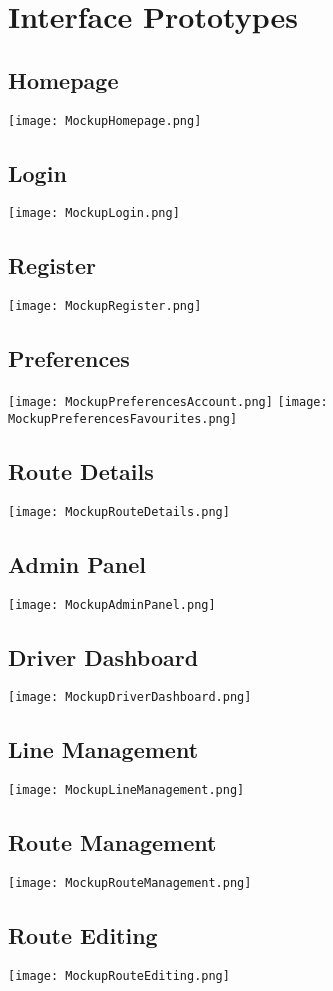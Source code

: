 \section{Interface Prototypes}

\subsection{Homepage}

\texttt{[image: MockupHomepage.png]}

\subsection{Login}

\texttt{[image: MockupLogin.png]}

\subsection{Register}

\texttt{[image: MockupRegister.png]}

\subsection{Preferences}

\texttt{[image: MockupPreferencesAccount.png]}
\texttt{[image: MockupPreferencesFavourites.png]}

\subsection{Route Details}

\texttt{[image: MockupRouteDetails.png]}

\subsection{Admin Panel}

\texttt{[image: MockupAdminPanel.png]}

\subsection{Driver Dashboard}

\texttt{[image: MockupDriverDashboard.png]}

\subsection{Line Management}

\texttt{[image: MockupLineManagement.png]}

\subsection{Route Management}

\texttt{[image: MockupRouteManagement.png]}

\subsection{Route Editing}

\texttt{[image: MockupRouteEditing.png]}
